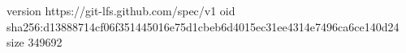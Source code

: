 version https://git-lfs.github.com/spec/v1
oid sha256:d13888714cf06f351445016e75d1cbeb6d4015ec31ee4314e7496ca6ce140d24
size 349692
